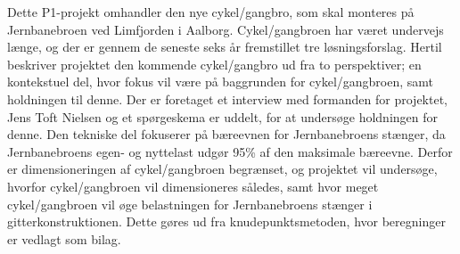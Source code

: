 Dette P1-projekt omhandler den nye cykel/gangbro, som skal monteres på Jernbanebroen ved Limfjorden i Aalborg.
\newline
\newline
Cykel/gangbroen har været undervejs længe, og der er gennem de seneste seks år fremstillet tre løsningsforslag. Hertil beskriver projektet den kommende cykel/gangbro ud fra to perspektiver; en kontekstuel del, hvor fokus vil være på baggrunden for cykel/gangbroen, samt holdningen til denne. Der er foretaget et interview med formanden for projektet, Jens Toft Nielsen og et spørgeskema er uddelt, for at undersøge holdningen for denne. Den tekniske del fokuserer på bæreevnen for Jernbanebroens stænger, da Jernbanebroens egen- og nyttelast udgør 95\% af den maksimale bæreevne. Derfor er dimensioneringen af cykel/gangbroen begrænset, og projektet vil undersøge, hvorfor cykel/gangbroen vil dimensioneres således, samt hvor meget cykel/gangbroen vil øge belastningen for Jernbanebroens stænger i gitterkonstruktionen. Dette gøres ud fra knudepunktsmetoden, hvor beregninger er vedlagt som bilag.
